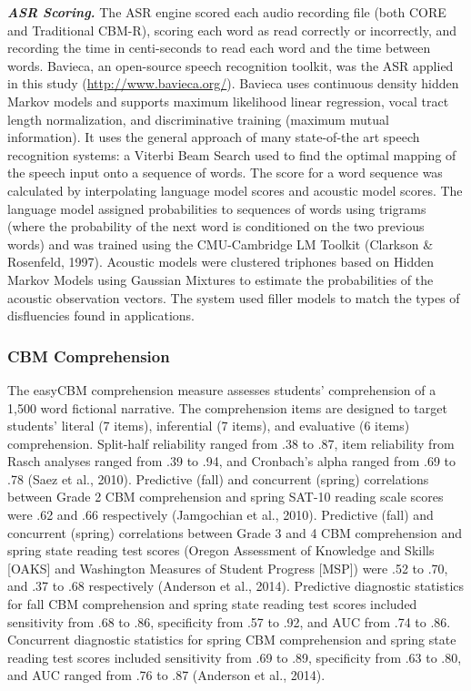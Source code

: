 \documentclass[
  english,
  man, fleqn, noextraspace]{apa6}
\begin{document}
\textbf{\emph{ASR Scoring.}} The ASR engine scored each audio recording file (both CORE and Traditional CBM-R), scoring each word as read correctly or incorrectly, and recording the time in centi-seconds to read each word and the time between words. Bavieca, an open-source speech recognition toolkit, was the ASR applied in this study (\url{http://www.bavieca.org/}). Bavieca uses continuous density hidden Markov models and supports maximum likelihood linear regression, vocal tract length normalization, and discriminative training (maximum mutual information). It uses the general approach of many state-of-the art speech recognition systems: a Viterbi Beam Search used to find the optimal mapping of the speech input onto a sequence of words. The score for a word sequence was calculated by interpolating language model scores and acoustic model scores. The language model assigned probabilities to sequences of words using trigrams (where the probability of the next word is conditioned on the two previous words) and was trained using the CMU-Cambridge LM Toolkit (Clarkson \& Rosenfeld, 1997). Acoustic models were clustered triphones based on Hidden Markov Models using Gaussian Mixtures to estimate the probabilities of the acoustic observation vectors. The system used filler models to match the types of disfluencies found in applications.

\hypertarget{cbm-comprehension}{%
\subsubsection{CBM Comprehension}\label{cbm-comprehension}}

The easyCBM comprehension measure assesses students' comprehension of a 1,500 word fictional narrative. The comprehension items are designed to target students' literal (7 items), inferential (7 items), and evaluative (6 items) comprehension. Split-half reliability ranged from .38 to .87, item reliability from Rasch analyses ranged from .39 to .94, and Cronbach's alpha ranged from .69 to .78 (Saez et al., 2010). Predictive (fall) and concurrent (spring) correlations between Grade 2 CBM comprehension and spring SAT-10 reading scale scores were .62 and .66 respectively (Jamgochian et al., 2010). Predictive (fall) and concurrent (spring) correlations between Grade 3 and 4 CBM comprehension and spring state reading test scores (Oregon Assessment of Knowledge and Skills {[}OAKS{]} and Washington Measures of Student Progress {[}MSP{]}) were .52 to .70, and .37 to .68 respectively (Anderson et al., 2014). Predictive diagnostic statistics for fall CBM comprehension and spring state reading test scores included sensitivity from .68 to .86, specificity from .57 to .92, and AUC from .74 to .86. Concurrent diagnostic statistics for spring CBM comprehension and spring state reading test scores included sensitivity from .69 to .89, specificity from .63 to .80, and AUC ranged from .76 to .87 (Anderson et al., 2014).
\end{document}
